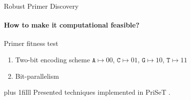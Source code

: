 \documentclass[xcolor=dvipsnames,envcountsect]{beamer}
\newcommand{\flushdown}{\vskip0pt plus 1filll}
\begin{document}
\begin{frame}{Robust Primer Discovery}
\framesubtitle{How to make it computational feasible?}
Primer fitness test
\begin{enumerate}
    \item Two-bit encoding scheme $\texttt{A}\mapsto 00$, $\texttt{C}\mapsto 01$,  $\texttt{G}\mapsto 10$, $\texttt{T}\mapsto 11$ %
    \item<2> Bit-parallelism %
\end{enumerate}
\flushdown
Presented techniques implemented in PriSeT \cite{PriSeTGitHub}.
\end{frame}
\end{document}
